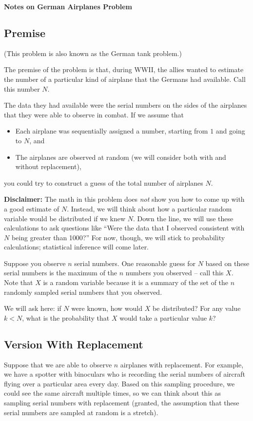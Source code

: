 \documentclass[11pt]{article}
\begin{document}
\centerline{\textbf{Notes on German Airplanes Problem}}
\subsection*{Premise}
(This problem is also known as the German tank problem.)

The premise of the problem is that, during WWII, the allies wanted to estimate the number of
a particular kind of airplane that the Germans had available. Call this number $N$.

The data they had available were the serial numbers on the sides of the airplanes that they
were able to observe in combat. If we assume that
\begin{itemize}
    \item Each airplane was sequentially assigned a number, starting from $1$ and going to $N$, and
    \item The airplanes are observed at random (we will consider both with and without replacement),
\end{itemize}
you could try to construct a guess of the total number of airplanes $N$.

{\bf Disclaimer:} The math in this problem does \emph{not} show you how to come up with a good estimate of
$N$. Instead, we will think about how a particular random variable would be distributed if we knew
$N$. Down the line, we will use these calculations to ask questions like ``Were the data that I observed
consistent with $N$ being greater than 1000?'' For now, though, we will stick to probability calculations;
statistical inference will come later.

Suppose you observe $n$ serial numbers. One reasonable guess for $N$ based on these serial numbers
is the maximum of the $n$ numbers you observed -- call this $X$. Note that $X$ is a random variable
because it is a summary of the set of the $n$ randomly sampled serial numbers that you observed.

We will ask here: if $N$ were known, how would $X$ be distributed? For any value $k < N$, what
is the probability that $X$ would take a particular value $k$?

\subsection*{Version With Replacement}
Suppose that we are able to observe $n$ airplanes with replacement. For example, we have a spotter with
binoculars who is recording the serial numbers of aircraft flying over a particular area every day. Based on this
sampling procedure, we could see the same aircraft multiple times, so we can think about this as
sampling serial numbers with replacement (granted, the assumption that these serial numbers are sampled at random
is a stretch).
\end{document}
